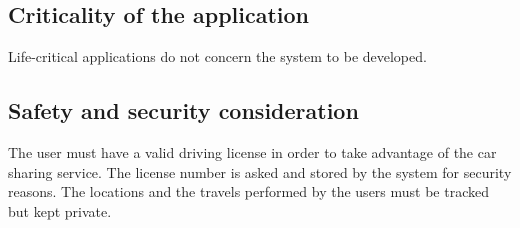 \subsection{Criticality of the application}
Life-critical applications do not concern the system to be developed.

\subsection{Safety and security consideration}
The user must have a valid driving license in order to take advantage of the car sharing service. The license number is asked and stored by the system for security reasons. The locations and the travels performed by the users must be tracked but kept private.